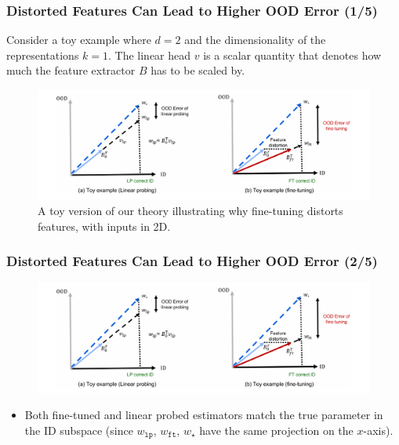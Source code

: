 \documentclass[16pt,aspectratio=169]{beamer}
\begin{document}
\begin{frame}
    \frametitle{Distorted Features Can Lead to Higher OOD Error (1/5)}

    Consider a toy example where $d=2$ and the dimensionality of the representations $k=1$. The linear head $v$ is a scalar quantity that denotes how much the feature extractor $B$ has to be scaled by.

    \begin{figure}[htbp]
        \centering
        \includegraphics[width=.9\textwidth]{figures/toy-example.png}
        \caption{A toy version of our theory illustrating why fine-tuning distorts features, with inputs in 2D.}
    \end{figure}

\end{frame}

\begin{frame}
    \frametitle{Distorted Features Can Lead to Higher OOD Error (2/5)}

    \begin{figure}[htbp]
        \centering
        \includegraphics[width=\textwidth]{figures/toy-example.png}
    \end{figure}

    \begin{itemize}
        \item Both fine-tuned and linear probed estimators match the true parameter in the ID subspace (since $w_{\mathtt{lp}}$, $w_{\mathtt{ft}}$, $w_{\mathtt{\star}}$ have the same projection on the $x$-axis).
    \end{itemize}

\end{frame}
\end{document}
